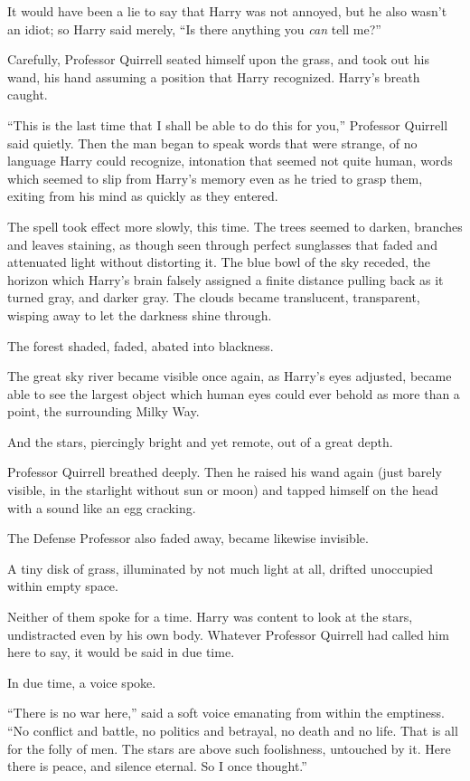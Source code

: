 It would have been a lie to say that Harry was not annoyed, but he also wasn’t an idiot; so Harry said merely, “Is there anything you \emph{can} tell me?”

Carefully, Professor Quirrell seated himself upon the grass, and took out his wand, his hand assuming a position that Harry recognized. Harry’s breath caught.

“This is the last time that I shall be able to do this for you,” Professor Quirrell said quietly. Then the man began to speak words that were strange, of no language Harry could recognize, intonation that seemed not quite human, words which seemed to slip from Harry’s memory even as he tried to grasp them, exiting from his mind as quickly as they entered.

The spell took effect more slowly, this time. The trees seemed to darken, branches and leaves staining, as though seen through perfect sunglasses that faded and attenuated light without distorting it. The blue bowl of the sky receded, the horizon which Harry’s brain falsely assigned a finite distance pulling back as it turned gray, and darker gray. The clouds became translucent, transparent, wisping away to let the darkness shine through.

The forest shaded, faded, abated into blackness.

The great sky river became visible once again, as Harry’s eyes adjusted, became able to see the largest object which human eyes could ever behold as more than a point, the surrounding Milky Way.

And the stars, piercingly bright and yet remote, out of a great depth.

Professor Quirrell breathed deeply. Then he raised his wand again (just barely visible, in the starlight without sun or moon) and tapped himself on the head with a sound like an egg cracking.

The Defense Professor also faded away, became likewise invisible.

A tiny disk of grass, illuminated by not much light at all, drifted unoccupied within empty space.

Neither of them spoke for a time. Harry was content to look at the stars, undistracted even by his own body. Whatever Professor Quirrell had called him here to say, it would be said in due time.

In due time, a voice spoke.

“There is no war here,” said a soft voice emanating from within the emptiness. “No conflict and battle, no politics and betrayal, no death and no life. That is all for the folly of men. The stars are above such foolishness, untouched by it. Here there is peace, and silence eternal. So I once thought.”

